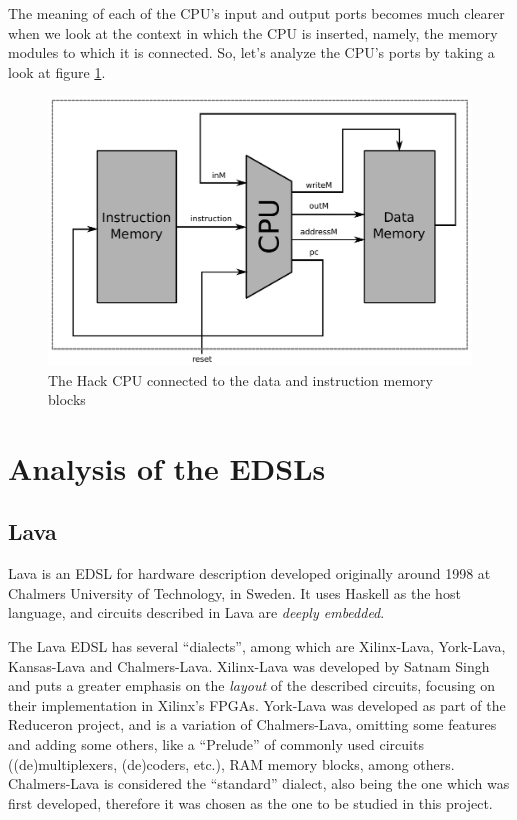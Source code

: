 \documentclass[a4paper]{article}
\begin{document}
            The meaning of each of the CPU's input and output ports becomes much clearer when we
            look at the context in which the CPU is inserted, namely, the memory modules to which it
            is connected. So, let's analyze the CPU's ports by taking a look at figure
            \ref{fig:cpu-memory}.
            \begin{figure}[h]
                \begin{center}
                    \includegraphics[width=1.0\textwidth]{imgs/cpu-memory.pdf}
                \end{center}
                \caption{The Hack CPU connected to the data and instruction memory blocks
                    \label{fig:cpu-memory}}
            \end{figure}

    \section{Analysis of the EDSLs}
    \label{sec:edsls}

        \subsection{Lava}
        \label{subsec:lava}
            Lava\cite{lava1998} is an EDSL for hardware description developed originally around 1998
            at Chalmers University of Technology, in Sweden. It uses Haskell as the host language,
            and circuits described in Lava are \emph{deeply embedded}.

            The Lava EDSL has several ``dialects'', among which are Xilinx-Lava, York-Lava,
            Kansas-Lava and Chalmers-Lava. Xilinx-Lava was developed by Satnam Singh and puts a
            greater emphasis on the \emph{layout} of the described circuits, focusing on their
            implementation in Xilinx's FPGAs. York-Lava was developed as part of the Reduceron
            project, and is a variation of Chalmers-Lava, omitting some features and adding some
            others, like a ``Prelude'' of commonly used circuits ((de)multiplexers, (de)coders,
            etc.), RAM memory blocks, among others. Chalmers-Lava is considered the ``standard''
            dialect, also being the one which was first developed, therefore it was chosen as the
            one to be studied in this project.
\end{document}
